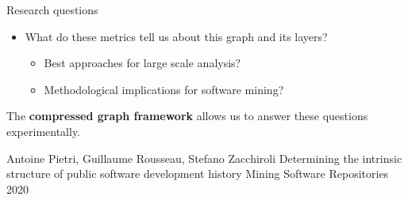 \documentclass[aspectratio=169,xcolor=table]{beamer}
\begin{document}
\begin{frame}
\begin{block}{Research questions}
\begin{itemize}
                \item What do these metrics tell us about this graph and its
                    layers?
                    \begin{itemize}
                \item Best approaches for large scale analysis?
                \item Methodological implications for software mining?
                    \end{itemize}
            \end{itemize}

            The \textbf{compressed graph framework} allows us to answer these
            questions experimentally.

            \footnotesize
            \begin{thebibliography}{swhforks}
                 Antoine Pietri, Guillaume Rousseau, Stefano Zacchiroli\newblock
                Determining the intrinsic structure of public software development history\newblock
                Mining Software Repositories 2020\newblock
            \end{thebibliography}
        \end{block}
    \end{frame}



\end{document}

